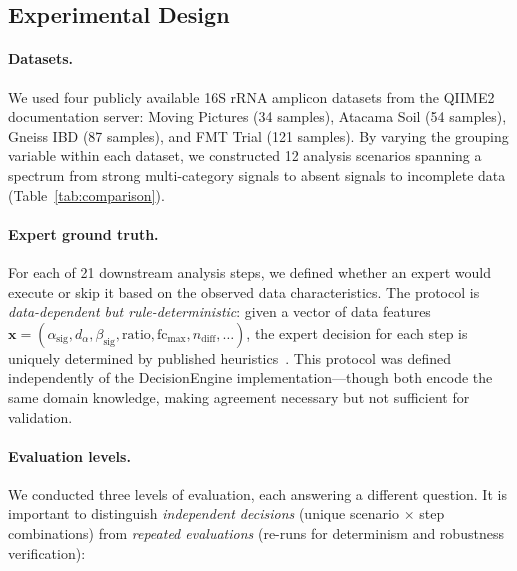 \documentclass[11pt,a4paper]{article}
\begin{document}
\subsection{Experimental Design}
\label{sec:eval-setup}

\paragraph{Datasets.}
We used four publicly available 16S rRNA amplicon datasets from the
QIIME2 documentation server: Moving Pictures (34 samples),
Atacama Soil (54 samples), Gneiss IBD (87 samples), and FMT Trial
(121 samples).
By varying the grouping variable within each dataset, we constructed
12 analysis scenarios spanning a spectrum from strong multi-category
signals to absent signals to incomplete data (Table~\ref{tab:comparison}).

\paragraph{Expert ground truth.}
For each of 21 downstream analysis steps, we defined whether an
expert would execute or skip it based on the observed data
characteristics.
The protocol is \textit{data-dependent but rule-deterministic}:
given a vector of data features
$\mathbf{x} = (\alpha_{\mathrm{sig}}, d_\alpha, \beta_{\mathrm{sig}},
\mathrm{ratio}, \mathrm{fc}_{\max}, n_{\mathrm{diff}}, \ldots)$,
the expert decision for each step is uniquely determined by
published heuristics~\citep{anderson2001,willis2019,gloor2017,mcmurdie2014}.
This protocol was defined independently of the DecisionEngine
implementation---though both encode the same domain knowledge,
making agreement necessary but not sufficient for validation.

\paragraph{Evaluation levels.}
We conducted three levels of evaluation, each answering a different
question.
It is important to distinguish \textit{independent decisions}
(unique scenario $\times$ step combinations) from
\textit{repeated evaluations} (re-runs for determinism and
robustness verification):
\end{document}
